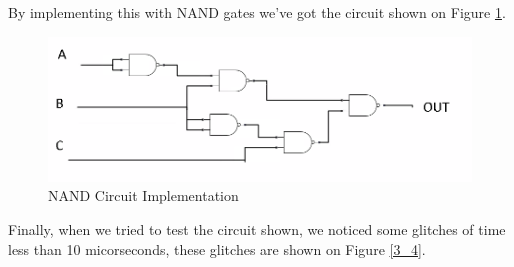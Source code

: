 By implementing this with NAND gates we've got the circuit shown on
Figure \ref{3_3}.

\begin{figure}[h!]
\begin{centering}
\includegraphics[scale=0.3]{../Exercise3/images/CIRCUIT}
\par\end{centering}
\caption{\color{cyan}NAND Circuit Implementation}
\label{3_3}

\end{figure}

Finally, when we tried to test the circuit shown, we noticed some
glitches of time less than 10 micorseconds, these glitches are shown
on Figure \ref{3_4}.

